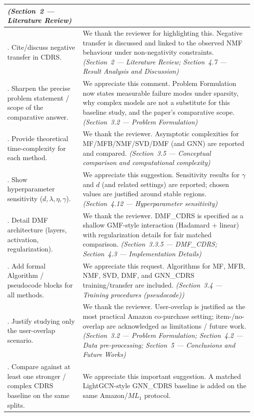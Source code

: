 \documentclass[11pt,a4paper]{article}
\begin{document}
{\begin{longtable}{@{}>{\raggedright\arraybackslash}p{}|>{\raggedright\arraybackslash}p{}@{}}
\textit{(Section~2 --- Literature Review)} \\
\midrule
8. Cite/discuss negative transfer in CDRS.
&
We thank the reviewer for highlighting this. Negative transfer is discussed and linked to the observed NMF behaviour under non-negativity constraints.
\textit{(Section~2 --- Literature Review; Section~4.7 --- Result Analysis and Discussion)} \\
\midrule
9. Sharpen the precise problem statement / scope of the comparative answer.
&
We appreciate this comment. Problem Formulation now states measurable failure modes under sparsity, why complex models are not a substitute for this baseline study, and the paper's comparative scope.
\textit{(Section~3.2 --- Problem Formulation)} \\
\midrule
10. Provide theoretical time-complexity for each method.
&
We thank the reviewer. Asymptotic complexities for MF/MFB/NMF/SVD/DMF (and GNN) are reported and compared.
\textit{(Section~3.5 --- Conceptual comparison and computational complexity)} \\
\midrule
11. Show hyperparameter sensitivity ($d,\lambda,\eta,\gamma$).
&
We appreciate this suggestion. Sensitivity results for $\gamma$ and $d$ (and related settings) are reported; chosen values are justified around stable regions.
\textit{(Section~4.12 --- Hyperparameter sensitivity)} \\
\midrule
12. Detail DMF architecture (layers, activation, regularization).
&
We thank the reviewer. DMF\_CDRS is specified as a shallow GMF-style interaction (Hadamard + linear) with regularization details for fair matched comparison.
\textit{(Section~3.3.5 --- DMF\_CDRS; Section~4.3 --- Implementation Details)} \\
\midrule
13. Add formal Algorithm / pseudocode blocks for all methods.
&
We appreciate this request. Algorithms for MF, MFB, NMF, SVD, DMF, and GNN\_CDRS training/transfer are included.
\textit{(Section~3.4 --- Training procedures (pseudocode))} \\
\midrule
14. Justify studying only the user-overlap scenario.
&
We thank the reviewer. User-overlap is justified as the most practical Amazon co-purchase setting; item-/no-overlap are acknowledged as limitations / future work.
\textit{(Section~3.2 --- Problem Formulation; Section~4.2 --- Data pre-processing; Section~5 --- Conclusions and Future Works)} \\
\midrule
15. Compare against at least one stronger / complex CDRS baseline on the same splits.
&
We appreciate this important suggestion. A matched LightGCN-style GNN\_CDRS baseline is added on the same Amazon/$ML_1$ protocol.

\end{longtable}}
\end{document}
